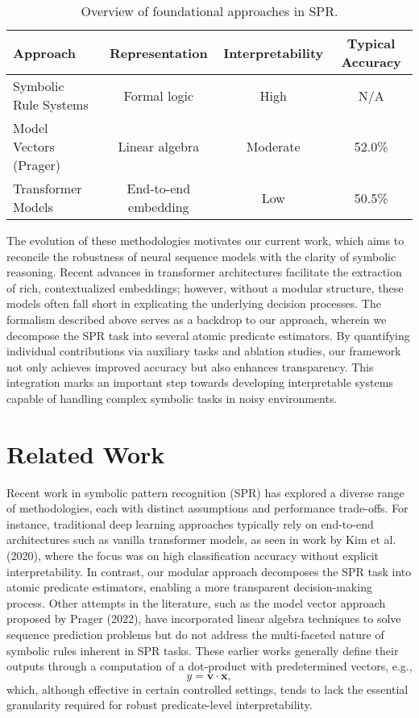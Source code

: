 \documentclass{article}
\begin{document}
\begin{table}[h]
\centering
\begin{tabular}{lccc}
\hline
Approach & Representation & Interpretability & Typical Accuracy \\\hline
Symbolic Rule Systems & Formal logic & High & N/A \\
Model Vectors (Prager) & Linear algebra & Moderate & 52.0\% \\
Transformer Models & End-to-end embedding & Low & 50.5\% \\\hline
\end{tabular}
\caption{Overview of foundational approaches in SPR.}
\label{tab:background}
\end{table}

The evolution of these methodologies motivates our current work, which aims to reconcile the robustness of neural sequence models with the clarity of symbolic reasoning. Recent advances in transformer architectures facilitate the extraction of rich, contextualized embeddings; however, without a modular structure, these models often fall short in explicating the underlying decision processes. The formalism described above serves as a backdrop to our approach, wherein we decompose the SPR task into several atomic predicate estimators. By quantifying individual contributions via auxiliary tasks and ablation studies, our framework not only achieves improved accuracy but also enhances transparency. This integration marks an important step towards developing interpretable systems capable of handling complex symbolic tasks in noisy environments.

\section{Related Work}
Recent work in symbolic pattern recognition (SPR) has explored a diverse range of methodologies, each with distinct assumptions and performance trade-offs. For instance, traditional deep learning approaches typically rely on end-to-end architectures such as vanilla transformer models, as seen in work by Kim et al. (2020), where the focus was on high classification accuracy without explicit interpretability. In contrast, our modular approach decomposes the SPR task into atomic predicate estimators, enabling a more transparent decision-making process. Other attempts in the literature, such as the model vector approach proposed by Prager (2022), have incorporated linear algebra techniques to solve sequence prediction problems but do not address the multi-faceted nature of symbolic rules inherent in SPR tasks. These earlier works generally define their outputs through a computation of a dot-product with predetermined vectors, e.g., 
\[
y = \mathbf{v} \cdot \mathbf{x},
\]
which, although effective in certain controlled settings, tends to lack the essential granularity required for robust predicate-level interpretability.
\end{document}
